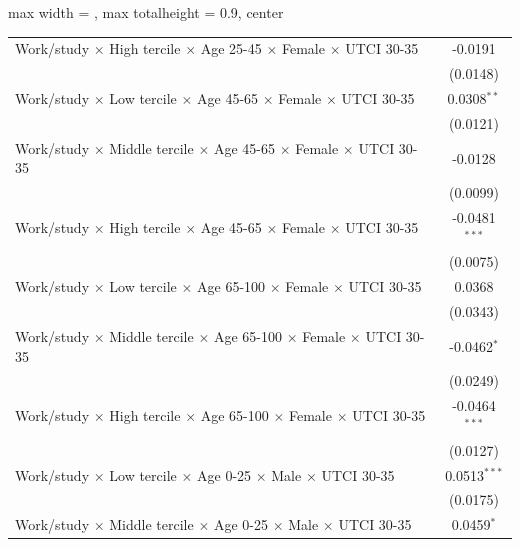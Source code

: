 \begin{table}[htbp]
\begin{adjustbox}{max width = \textwidth, max totalheight = 0.9\textheight, center}
\begin{tabular}{lc}
         Work/study $\times$ High tercile $\times$ Age 25-45 $\times$ Female $\times$ UTCI 30-35        & -0.0191\\   
                                                                                                        & (0.0148)\\   
         Work/study $\times$ Low tercile $\times$ Age 45-65 $\times$ Female $\times$ UTCI 30-35         & 0.0308$^{**}$\\   
                                                                                                        & (0.0121)\\   
         Work/study $\times$ Middle tercile $\times$ Age 45-65 $\times$ Female $\times$ UTCI 30-35      & -0.0128\\   
                                                                                                        & (0.0099)\\   
         Work/study $\times$ High tercile $\times$ Age 45-65 $\times$ Female $\times$ UTCI 30-35        & -0.0481$^{***}$\\   
                                                                                                        & (0.0075)\\   
         Work/study $\times$ Low tercile $\times$ Age 65-100 $\times$ Female $\times$ UTCI 30-35        & 0.0368\\   
                                                                                                        & (0.0343)\\   
         Work/study $\times$ Middle tercile $\times$ Age 65-100 $\times$ Female $\times$ UTCI 30-35     & -0.0462$^{*}$\\   
                                                                                                        & (0.0249)\\   
         Work/study $\times$ High tercile $\times$ Age 65-100 $\times$ Female $\times$ UTCI 30-35       & -0.0464$^{***}$\\   
                                                                                                        & (0.0127)\\   
         Work/study $\times$ Low tercile $\times$ Age 0-25 $\times$ Male $\times$ UTCI 30-35            & 0.0513$^{***}$\\   
                                                                                                        & (0.0175)\\   
         Work/study $\times$ Middle tercile $\times$ Age 0-25 $\times$ Male $\times$ UTCI 30-35         & 0.0459$^{*}$\\   

\end{tabular}
\end{adjustbox}
\end{table}
